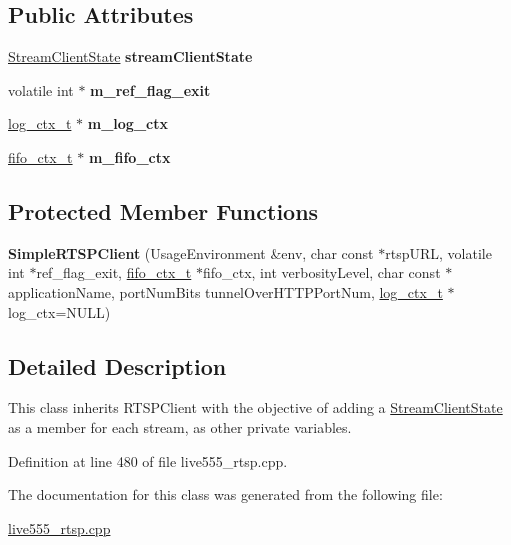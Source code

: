 \subsection*{Public Attributes}
\begin{DoxyCompactItemize}
\item 
\hyperlink{classStreamClientState}{Stream\+Client\+State} {\bfseries stream\+Client\+State}\hypertarget{classSimpleRTSPClient_a44482bf42e2aec10d383fed5d9e2d128}{}\label{classSimpleRTSPClient_a44482bf42e2aec10d383fed5d9e2d128}

\item 
volatile int $\ast$ {\bfseries m\+\_\+ref\+\_\+flag\+\_\+exit}\hypertarget{classSimpleRTSPClient_a40c26da532ddbc1d36c60688fc3cb35c}{}\label{classSimpleRTSPClient_a40c26da532ddbc1d36c60688fc3cb35c}

\item 
\hyperlink{structlog__ctx__s}{log\+\_\+ctx\+\_\+t} $\ast$ {\bfseries m\+\_\+log\+\_\+ctx}\hypertarget{classSimpleRTSPClient_afb0a7189511a5433a152136a3ec90cc7}{}\label{classSimpleRTSPClient_afb0a7189511a5433a152136a3ec90cc7}

\item 
\hyperlink{fifo_8c_acf3f21e64cbabccd8420c306740820c1}{fifo\+\_\+ctx\+\_\+t} $\ast$ {\bfseries m\+\_\+fifo\+\_\+ctx}\hypertarget{classSimpleRTSPClient_abc2f811a9accfb7c6f50f3a240f33d09}{}\label{classSimpleRTSPClient_abc2f811a9accfb7c6f50f3a240f33d09}

\end{DoxyCompactItemize}
\subsection*{Protected Member Functions}
\begin{DoxyCompactItemize}
\item 
{\bfseries Simple\+R\+T\+S\+P\+Client} (Usage\+Environment \&env, char const $\ast$rtsp\+U\+RL, volatile int $\ast$ref\+\_\+flag\+\_\+exit, \hyperlink{fifo_8c_acf3f21e64cbabccd8420c306740820c1}{fifo\+\_\+ctx\+\_\+t} $\ast$fifo\+\_\+ctx, int verbosity\+Level, char const $\ast$application\+Name, port\+Num\+Bits tunnel\+Over\+H\+T\+T\+P\+Port\+Num, \hyperlink{structlog__ctx__s}{log\+\_\+ctx\+\_\+t} $\ast$log\+\_\+ctx=N\+U\+LL)\hypertarget{classSimpleRTSPClient_acc028f7094149456d884b347f720b663}{}\label{classSimpleRTSPClient_acc028f7094149456d884b347f720b663}

\end{DoxyCompactItemize}


\subsection{Detailed Description}
This class inherits R\+T\+S\+P\+Client with the objective of adding a \hyperlink{classStreamClientState}{Stream\+Client\+State} as a member for each stream, as other private variables. 

Definition at line 480 of file live555\+\_\+rtsp.\+cpp.



The documentation for this class was generated from the following file\+:\begin{DoxyCompactItemize}
\item 
\hyperlink{live555__rtsp_8cpp}{live555\+\_\+rtsp.\+cpp}\end{DoxyCompactItemize}
